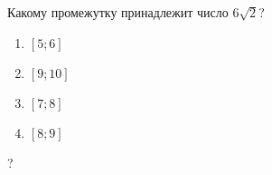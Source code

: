 \begin{ex}
	Какому промежутку принадлежит число $6\sqrt{2}$?
	
	\selectanswer
	\begin{multicols}{4}
		\begin{enumerate}[label=\arabic*)]
			\item $[5;6]$
			\item $[9;10]$
			\item $[7;8]$
			\item $[8;9]$
		\end{enumerate}
	\end{multicols}
	\begin{answer}
		?
	\end{answer}
\end{ex}